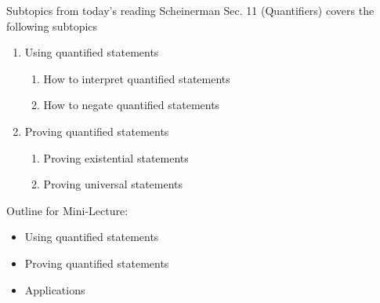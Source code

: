 \documentclass[10pt]{beamer}
\begin{document}
\begin{frame}{Subtopics from today's reading}
Scheinerman Sec. 11 (Quantifiers) covers the following subtopics
\begin{enumerate}
	\item Using quantified statements
	\begin{enumerate}
	\item[a.] How to interpret quantified statements
 	\item[b.] How to negate quantified statements
 	\end{enumerate}
	\item Proving quantified statements
	\begin{enumerate}
	\item[a.] Proving existential statements
	\item[b.] Proving universal statements
 	\end{enumerate}
\end{enumerate}

\end{frame}


\begin{frame}[standout]
Outline for Mini-Lecture:
\begin{itemize}
\item \alert{\textbullet \quad Using quantified statements}
\item \textbullet \quad Proving quantified statements
\item \textbullet \quad Applications
\end{itemize}
\end{frame}
\end{document}
